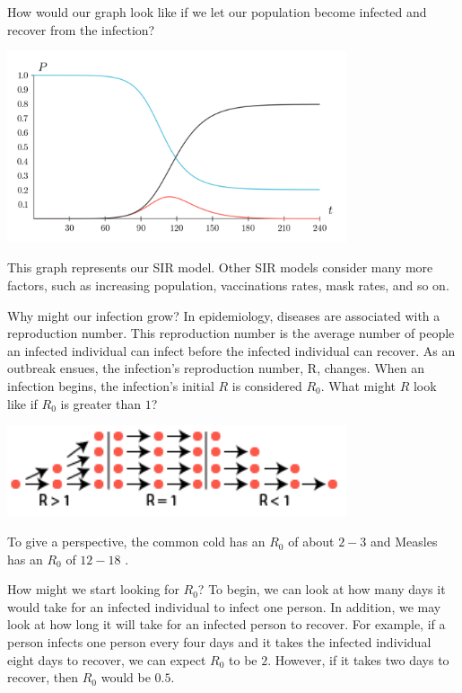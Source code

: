 \documentclass{amsart}
\theoremstyle{definition}
\numberwithin{equation}{section}
\begin{document}
\begin{sansmath}
How would our graph look like if we let our population become infected and recover from the infection?

\begin{center}
  \includegraphics[width=10cm]{SIRGraph}
\end{center}

This graph represents our SIR model. Other SIR models consider many more factors, such as increasing population, vaccinations rates, mask rates, and so on.

Why might our infection grow? In epidemiology, diseases are  associated with a reproduction number. This reproduction number is the average number of people an infected individual can infect before the infected individual can recover. As an outbreak ensues, the infection's reproduction number, R, changes. When an infection begins, the infection's initial $R$ is considered $R_0$. What might $R$ look like if $R_0$ is greater than $1$?

\begin{center}
  \includegraphics[width=10cm]{ReproductionNumber}
\end{center}

To give a perspective, the common cold has an $R_0$ of about $2-3$ and Measles has an $R_0$ of $12-18$ \cite{Shabir}.

How might we start looking for $R_0$? To begin, we can look at how many days it would take for an infected individual to infect one person. In addition, we may look at how long it will take for an infected person to recover. For example, if a person infects one person every four days and it takes the infected individual eight days to recover, we can expect $R_0$ to be $2$. However, if it takes two days to recover, then $R_0$ would be $0.5$.


\end{sansmath}
\end{document}
